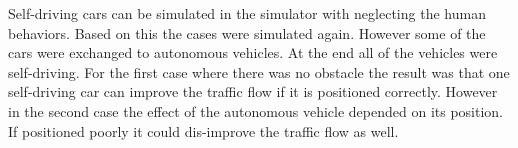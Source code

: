 Self-driving cars can be simulated in the simulator with neglecting the human behaviors. Based on this the cases were simulated again. However some of the cars were exchanged to autonomous vehicles. At the end all of the vehicles were self-driving. For the first case where there was no obstacle the result was that one self-driving car can improve the traffic flow if it is positioned correctly. However in the second case the effect of the autonomous vehicle depended on its position. If positioned poorly it could dis-improve the traffic flow as well.